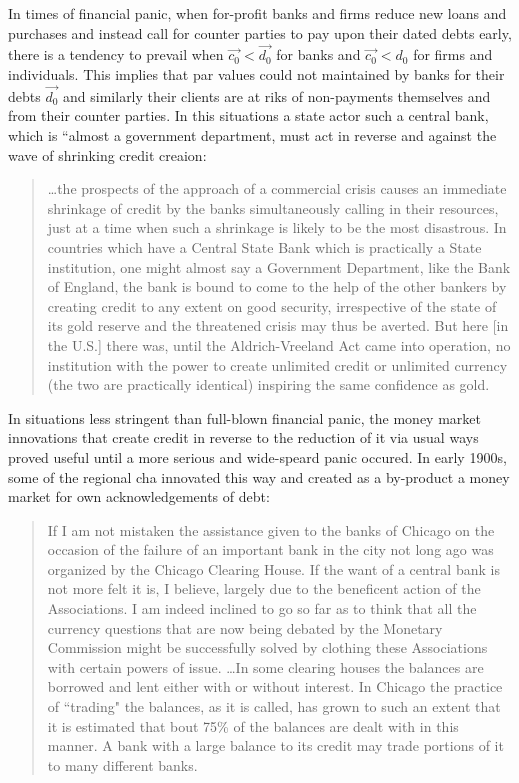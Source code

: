 In times of financial panic, when for-profit banks and firms reduce new loans and purchases and instead call for counter parties to pay upon their dated debts early, there is a tendency to prevail when $\overrightarrow{c_0}<\overrightarrow{d_0}$ for banks and $\overrightarrow{c_0}<d_0$ for firms and individuals. This implies that par values could not maintained by banks for their debts $\overrightarrow{d_0}$ and similarly their clients are at riks of non-payments themselves and from their counter parties. In this situations a state actor such a central bank, which is ``almost a government department, must act in reverse and against the wave of shrinking credit creaion:

\begin{quote}
\dots the prospects of the approach of a commercial crisis causes an immediate shrinkage of credit by the banks simultaneously calling in their resources, just at a time when such a shrinkage is likely to be the most disastrous. In countries which have a Central State Bank which is practically a State institution, one might almost say a Government Department, like the Bank of England, the bank is bound to come to the help of the other bankers by creating credit to any extent on good security, irrespective of the state of its gold reserve and the threatened crisis may thus be averted. But here [in the U.S.] there was, until the Aldrich-Vreeland Act came into operation, no institution with the power to create unlimited credit or unlimited currency (the two are practically identical) inspiring the same confidence as gold.~\citep[p.~13-14]{innes1910}
\end{quote}

In situations less stringent than full-blown financial panic, the money market innovations that create credit in reverse to the reduction of it via usual ways proved useful until a more serious and wide-speard panic occured. In early 1900s, some of the regional \acf{cha} innovated this way and created as a by-product a money market for own acknowledgements of debt: 

\begin{quote}
If I am not mistaken the assistance given to the banks of Chicago on the occasion of the failure of an important bank in the city not long ago was organized by the Chicago Clearing House. If the want of a central bank is not more felt it is, I believe, largely due to the beneficent action of the Associations. I am indeed inclined to go so far as to think that all the currency questions that are now being debated by the Monetary Commission might be successfully solved by clothing these Associations with certain powers of issue. \dots In some clearing houses the balances are borrowed and lent either with or without interest. In Chicago the practice of ``trading" the balances, as it is called, has grown to such an extent that it is estimated that bout 75\% of the balances are dealt with in this manner. A bank with a large balance to its credit may trade portions of it to many different banks.~\citep[p.~17-18]{innes1910}
\end{quote}

